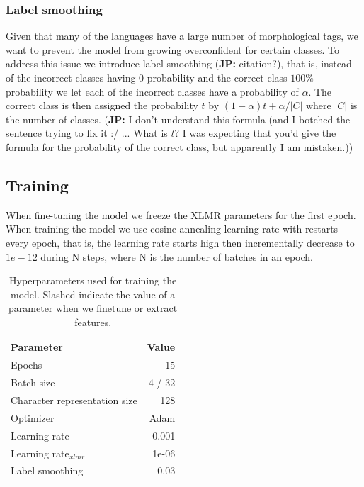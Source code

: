 \documentclass[11pt]{article}
\newcommand\jp[1]{(\textbf{JP:} #1)}
\begin{document}
	\subsubsection{Label smoothing}
	Given that many of the languages have a large number of
        morphological tags, we want to prevent the model from growing
        overconfident for certain classes. To address this issue we
        introduce label smoothing \jp{citation?}, that is, instead of
        the incorrect classes having 0 probability and the correct
        class $100\%$ probability we let each of the incorrect classes
        have a probability of $\alpha$. The correct class is then
        assigned the probability $t$ by $(1-\alpha)t + \alpha / |C|$
        where $|C|$ is the number of classes. \jp{I don't understand
          this formula (and I botched the sentence trying to fix it :/
          ... What is $t$? I was expecting that you'd give the formula
          for the probability of the correct class, but apparently I
          am mistaken.)}

	\subsection{Training}
	
	When fine-tuning the model we freeze the XLMR parameters for the first epoch.
	When training the model we use cosine annealing learning rate with restarts every epoch, that is, the learning rate starts high then incrementally decrease to $1e-12$ during N steps, where N is the number of batches in an epoch.
	
	\begin{table}[h]
		\centering
		\begin{tabular}{lr}
			Parameter & Value \\
			\hline
			Epochs & 15 \\
			Batch size & 4 / 32 \\
			Character representation size & 128 \\
			Optimizer & Adam \\
			Learning rate & 0.001 \\
			Learning rate$_{xlmr}$ & 1e-06 \\
			Label smoothing & 0.03 \\
			
		\end{tabular}
		\caption{\label{tab:parameters} Hyperparameters used for training the model. Slashed indicate the value of a parameter when we finetune or extract features.}
	\end{table}
\end{document}
